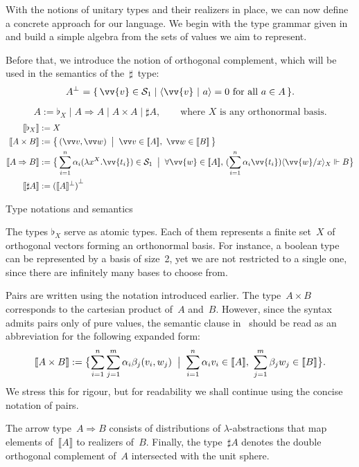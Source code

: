 \documentclass[runningheads,orivec,envcountsame,envcountsect]{llncs}
\newcommand\comp[2][]{#2^{\bot^{#1}}}
\newcommand\ansubst[2]{\ensuremath{\langle #1 \rangle_{#2}}}
\def\Sph{\mathcal{S}_1}       %
\def\scal#1#2{\langle{#1}~|~{#2}\rangle}
\def\Lam#1#2#3{\lambda#1^{#2}{.}#3} %
\def\Arr{\Rightarrow}
\def\sem#1{\llbracket#1\rrbracket}
\def\real{\Vdash}
\newcommand\basis[1]{\ensuremath{\flat_{#1}}}
\begin{document}
With the notions of unitary types and their realizers in place, we can now
define a concrete approach for our language. We begin with the type grammar
given in~ and build a simple algebra from the sets of
values we aim to represent.

Before that, we introduce the notion of orthogonal complement, which will be
used in the semantics of the~$\sharp$~type:
\[
  \comp{A} = \{\, \vv{v}\in \Sph \mid \scal{\vv{v}}{a} = 0 \text{ for all } a\in A\,\}.
\]
\begin{table}[t]
  \[
    A := \basis{X} \mid A\Arr A \mid A\times A \mid \sharp A,
    \qquad\text{where $X$ is any orthonormal basis.}
  \]
  \begin{align*}
    \sem{\basis{X}}&:= X\\
    \sem{A\times B}&:= \bigl\{\,(\vv v, \vv w)\;\bigm|\; \vv v\in\sem{A},~\vv w\in\sem{B}\,\bigr\}\\
    \sem{A\Arr B}&:=
    \bigl\{\,\sum_{i=1}^{n}\alpha_i(\Lam{x}{X}{\vv{t_i}})\in\Sph
      \;\bigm|\;
      \forall\vv{w}\in\sem{A},\,
      (\sum_{i=1}^{n}\alpha_i \vv{t_i})\ansubst{\vv{w}/x}{X}\real B
    \bigr\}\\
    \sem{\sharp A}&:= {(\sem{A}^\bot)}^\bot
  \end{align*}
  \caption{Type notations and semantics}
  \label{tab:UnitaryTypes}
\end{table}

The types $\basis{X}$ serve as atomic types. Each of them represents a finite
set~$X$ of orthogonal vectors forming an orthonormal basis. For instance, a
boolean type can be represented by a basis of size~2, yet we are not restricted
to a single one, since there are infinitely many bases to choose from.

Pairs are written using the notation introduced earlier.  The type~$A\times B$
corresponds to the cartesian product of~$A$ and~$B$.  However, since the syntax
admits pairs only of pure values, the semantic clause
in~ should be
read as an abbreviation for the following expanded form:
\[
  \sem{A\times B}
  := \bigl\{
       \sum_{i=1}^{n}\sum_{j=1}^{m}\alpha_i\beta_j(v_i,w_j)
       \;\bigm|\;
       \sum_{i=1}^{n}\alpha_i v_i\in\sem{A},~
       \sum_{j=1}^{m}\beta_j w_j\in\sem{B}
     \bigr\}.
\]
We stress this for rigour, but for readability we shall continue using the
concise notation of pairs.

The arrow type~$A\Arr B$ consists of distributions of $\lambda$-abstractions
that map elements of~$\sem{A}$ to realizers of~$B$.  
Finally, the type~$\sharp A$ denotes the double orthogonal complement of~$A$
intersected with the unit sphere.
\end{document}
